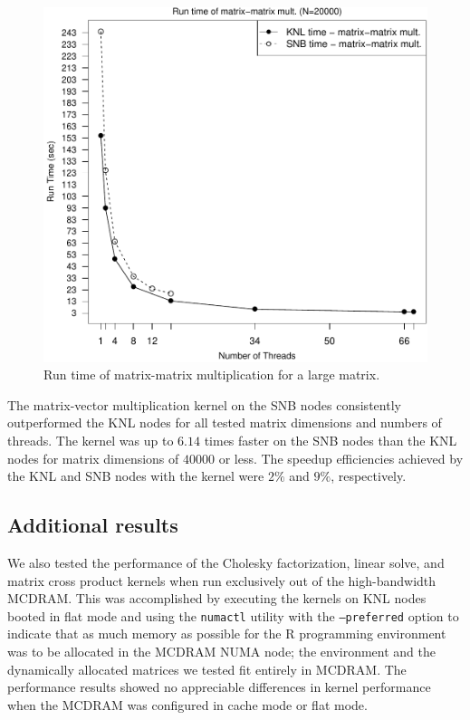 \begin{figure}
\includegraphics[height=\columnwidth, width=\columnwidth]{matmat_20000_68-rt.pdf}
\caption{Run time of matrix-matrix multiplication for a large matrix.}
\label{fig:largeMatmatTime}
\end{figure}

The matrix-vector multiplication kernel on the SNB nodes consistently outperformed the KNL
nodes for all tested matrix dimensions and numbers of threads. The kernel was up to $6.14$
times faster on the SNB nodes than the KNL nodes for matrix dimensions of $40000$ or less.
The speedup efficiencies achieved by the KNL and SNB nodes with the kernel were $2\%$ and
$9\%$, respectively.

\subsection{Additional results}

We also tested the performance of the Cholesky factorization, linear solve, and matrix
cross product kernels when run exclusively out of the high-bandwidth MCDRAM. This was
accomplished by executing the kernels on KNL nodes booted in flat mode and using the
\texttt{numactl} utility with the \texttt{--preferred} option to indicate that as much
memory as possible for the R programming environment was to be allocated in the MCDRAM
NUMA node; the environment and the dynamically allocated matrices we tested fit entirely
in MCDRAM. The performance results showed no appreciable differences in kernel performance
when the MCDRAM was configured in cache mode or flat mode.

